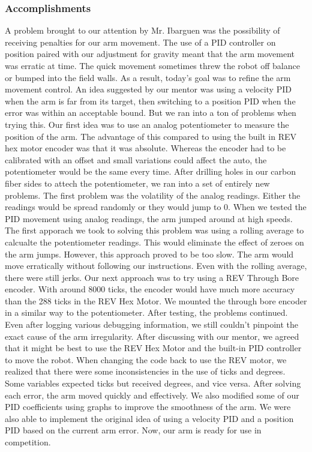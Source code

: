 \subsubsection*{Accomplishments}
A problem brought to our attention by Mr. Ibarguen was the possibility of receiving penalties for our arm movement. The use of a PID controller on position paired with our adjustment for gravity meant that the arm movement was erratic at time. The quick movement sometimes threw the robot off balance or bumped into the field walls. As a result, today's goal was to refine the arm movement control. 
An idea suggested by our mentor was using a velocity PID when the arm is far from its target, then switching to a position PID when the error was within an acceptable bound.
But we ran into a ton of problems when trying this. Our first idea was to use an analog potentiometer to measure the position of the arm. The advantage of this compared to using the built in REV hex motor encoder was that it was absolute. Whereas the encoder had to be calibrated with an offset and small variations could affect the auto, the potentiometer would be the same every time. 
After drilling holes in our carbon fiber sides to attech the potentiometer, we ran into a set of entirely new problems. The first problem was the volatility of the analog readings. Either the readings would be spread randomly or they would jump to 0. When we tested the PID movement using analog readings, the arm jumped around at high speeds. The first apporach we took to solving this problem was using a rolling average to calcualte the potentiometer readings. This would eliminate the effect of zeroes on the arm jumps. However, this approach proved to be too slow. The arm would move erratically without following our instructions. Even with the rolling average, there were still jerks.
Our next approach was to try using a REV Through Bore encoder. With around 8000 ticks, the encoder would have much more accuracy than the 288 ticks in the REV Hex Motor. We mounted the through bore encoder in a similar way to the potentiometer. After testing, the problems continued. Even after logging various debugging information, we still couldn't pinpoint the exact cause of the arm irregularity. 
After discussing with our mentor, we agreed that it might be best to use the REV Hex Motor and the built-in PID controller to move the robot. When changing the code back to use the REV motor, we realized that there were some inconsistencies in the use of ticks and degrees. Some variables expected ticks but received degrees, and vice versa. After solving each error, the arm moved quickly and effectively. We also modified some of our PID coefficients using graphs to improve the smoothness of the arm. We were also able to implement the original idea of using a velocity PID and a position PID based on the current arm error. Now, our arm is ready for use in competition. 


